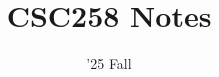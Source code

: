 \documentclass[11pt]{scrartcl}
\begin{document}
\title{CSC258 Notes}
\date{'25 Fall} %
\maketitle

\setcounter{tocdepth}{1}
\tableofcontents
\newpage

 \newpage
 \newpage
 \newpage
 \newpage
 \newpage
 \newpage
 \newpage
 \newpage

\end{document}
